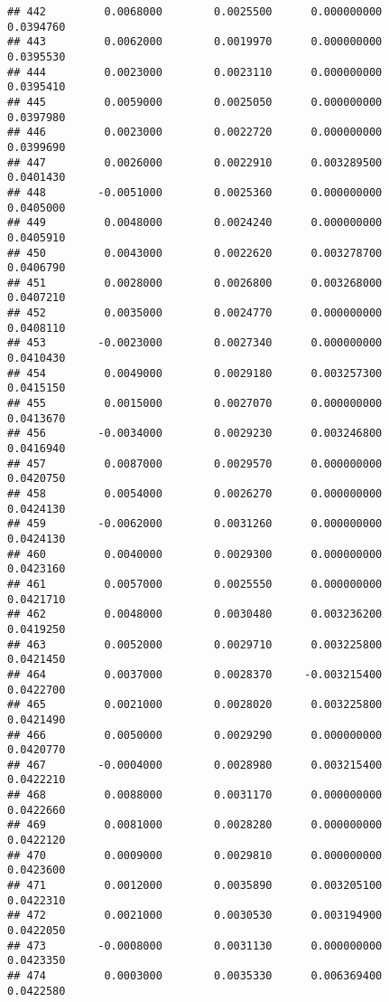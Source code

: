 \documentclass[
]{article}
\begin{document}
\begin{verbatim}
## 442         0.0068000        0.0025500      0.000000000             0.0394760
## 443         0.0062000        0.0019970      0.000000000             0.0395530
## 444         0.0023000        0.0023110      0.000000000             0.0395410
## 445         0.0059000        0.0025050      0.000000000             0.0397980
## 446         0.0023000        0.0022720      0.000000000             0.0399690
## 447         0.0026000        0.0022910      0.003289500             0.0401430
## 448        -0.0051000        0.0025360      0.000000000             0.0405000
## 449         0.0048000        0.0024240      0.000000000             0.0405910
## 450         0.0043000        0.0022620      0.003278700             0.0406790
## 451         0.0028000        0.0026800      0.003268000             0.0407210
## 452         0.0035000        0.0024770      0.000000000             0.0408110
## 453        -0.0023000        0.0027340      0.000000000             0.0410430
## 454         0.0049000        0.0029180      0.003257300             0.0415150
## 455         0.0015000        0.0027070      0.000000000             0.0413670
## 456        -0.0034000        0.0029230      0.003246800             0.0416940
## 457         0.0087000        0.0029570      0.000000000             0.0420750
## 458         0.0054000        0.0026270      0.000000000             0.0424130
## 459        -0.0062000        0.0031260      0.000000000             0.0424130
## 460         0.0040000        0.0029300      0.000000000             0.0423160
## 461         0.0057000        0.0025550      0.000000000             0.0421710
## 462         0.0048000        0.0030480      0.003236200             0.0419250
## 463         0.0052000        0.0029710      0.003225800             0.0421450
## 464         0.0037000        0.0028370     -0.003215400             0.0422700
## 465         0.0021000        0.0028020      0.003225800             0.0421490
## 466         0.0050000        0.0029290      0.000000000             0.0420770
## 467        -0.0004000        0.0028980      0.003215400             0.0422210
## 468         0.0088000        0.0031170      0.000000000             0.0422660
## 469         0.0081000        0.0028280      0.000000000             0.0422120
## 470         0.0009000        0.0029810      0.000000000             0.0423600
## 471         0.0012000        0.0035890      0.003205100             0.0422310
## 472         0.0021000        0.0030530      0.003194900             0.0422050
## 473        -0.0008000        0.0031130      0.000000000             0.0423350
## 474         0.0003000        0.0035330      0.006369400             0.0422580

\end{verbatim}
\end{document}
